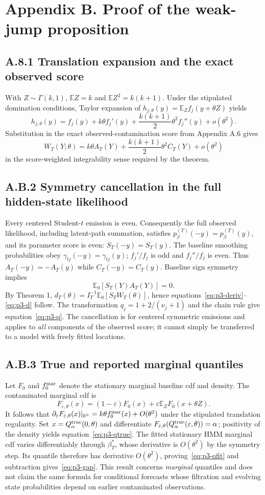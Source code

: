 \documentclass[11pt,a4paper]{article}
\newcommand{\E}{\mathbb E}
\newcommand{\eps}{\varepsilon}
\begin{document}
\section*{Appendix B. Proof of the weak-jump proposition}\label{app:p3}
\subsection*{A.8.1 Translation expansion and the exact observed score}
With $Z\sim\Gamma(k,1)$, $\E Z=k$ and $\E Z^2=k(k+1)$. Under the stipulated domination conditions, Taylor expansion of $h_{j,\theta}(y)=\E_Z f_j(y+\theta Z)$ yields
\[
 h_{j,\theta}(y)=f_j(y)+k\theta f_j'(y)
 +\frac{k(k+1)}2\theta^2 f_j''(y)+o(\theta^2).
\]
Substitution in the exact observed-contamination score from Appendix A.6 gives
\[
 W_T(Y;\theta)=k\theta A_T(Y)
 +\frac{k(k+1)}2\theta^2 C_T(Y)+o(\theta^2)
\]
in the score-weighted integrability sense required by the theorem.

\subsection*{A.B.2 Symmetry cancellation in the full hidden-state likelihood}
Every centered Student-$t$ emission is even. Consequently the full observed likelihood, including latent-path summation, satisfies $p_\beta^{(T)}(-y)=p_\beta^{(T)}(y)$, and its parameter score is even: $S_T(-y)=S_T(y)$. The baseline smoothing probabilities obey $\gamma_{tj}(-y)=\gamma_{tj}(y)$; $f_j'/f_j$ is odd and $f_j''/f_j$ is even. Thus $A_T(-y)=-A_T(y)$ while $C_T(-y)=C_T(y)$. Baseline sign symmetry implies
\[
 \E_0[S_T(Y)A_T(Y)]=0.
\]
By Theorem 1, $d_T(\theta)=I_T^{-1}\E_0[S_TW_T(\theta)]$, hence equations~\eqref{eq:p3-deriv}--\eqref{eq:p3-d} follow. The transformation $q_j=1+2/(\nu_j+1)$ and the chain rule give equation~\eqref{eq:p3-q}. The cancellation is for centered symmetric emissions and applies to \emph{all} components of the observed score; it cannot simply be transferred to a model with freely fitted locations.

\subsection*{A.B.3 True and reported marginal quantiles}
Let $F_0$ and $f_0^{\rm mar}$ denote the stationary marginal baseline cdf and density. The contaminated marginal cdf is
\[
 F_{\eps,\theta}(x)=(1-\eps)F_0(x)+\eps\E_Z F_0(x+\theta Z).
\]
It follows that $\partial_\eps F_{\eps,\theta}(x)|_{0^+}=k\theta f_0^{\rm mar}(x)+O(\theta^2)$ under the stipulated translation regularity. Set $x=Q_{\alpha}^{\rm true}(0,\theta)$ and differentiate $F_{\eps,\theta}(Q_{\alpha}^{\rm true}(\eps,\theta))=\alpha$; positivity of the density yields equation~\eqref{eq:p3-qtrue}. The fitted stationary HMM marginal cdf varies differentiably through $\beta_T^*$, whose derivative is $O(\theta^2)$ by the symmetry step. Its quantile therefore has derivative $O(\theta^2)$, proving~\eqref{eq:p3-qfit} and subtraction gives~\eqref{eq:p3-gap}. This result concerns \emph{marginal} quantiles and does not claim the same formula for conditional forecasts whose filtration and evolving state probabilities depend on earlier contaminated observations.
\end{document}
